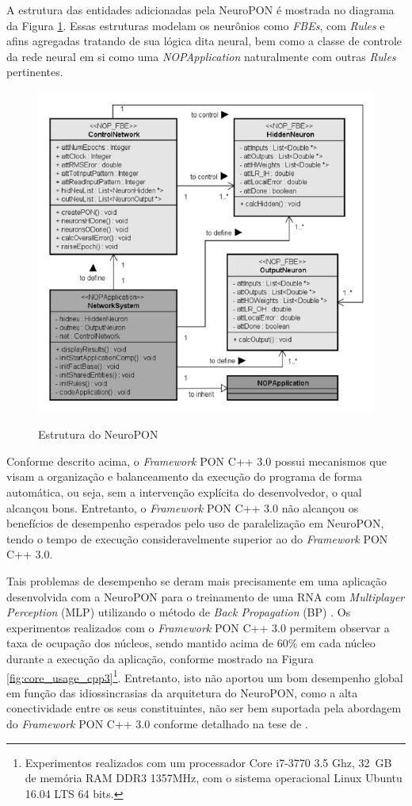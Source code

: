 A estrutura das entidades adicionadas pela NeuroPON é mostrada no diagrama da
Figura \ref{fig:neuro_struct}. Essas estruturas modelam os neurônios como
\textit{FBEs}, com \textit{Rules} e afins agregadas tratando de sua lógica dita
neural, bem como a classe de controle da rede neural em si como uma
\textit{NOPApplication} naturalmente com outras \textit{Rules} pertinentes.

\begin{figure}[!htb]
  \centering
  \caption{Estrutura do NeuroPON}
  \includegraphics[width=.6\textwidth]{../figures/neuropon_struct.png}
  \label{fig:neuro_struct}
\end{figure}

Conforme descrito acima, o \textit{Framework} PON C++ 3.0 possui mecanismos que
visam a organização e balanceamento da execução do programa de forma automática,
ou seja, sem a intervenção explícita do desenvolvedor, o qual alcançou bons.
Entretanto, o \textit{Framework} PON C++ 3.0 não alcançou os benefícios de
desempenho esperados pelo uso de paralelização em NeuroPON, tendo o tempo de
execução consideravelmente superior ao do \textit{Framework} PON C++ 3.0.

Tais problemas de desempenho se deram mais precisamente em uma aplicação
desenvolvida com a NeuroPON para o treinamento de uma RNA com
\textit{Multiplayer Perception} (MLP) utilizando o método de \textit{Back
Propagation} (BP) \cite{schutz_2018}. Os experimentos realizados com o
\textit{Framework} PON C++ 3.0 permitem observar a taxa de ocupação dos núcleos,
sendo mantido acima de 60\% em cada núcleo durante a execução da aplicação,
conforme mostrado na Figura \ref{fig:core_usage_cpp3}\footnote{Experimentos
realizados com um processador Core i7-3770 3.5 Ghz, 32 GB de memória RAM DDR3
1357MHz, com o sistema operacional Linux Ubuntu 16.04 LTS 64 bits.}. Entretanto,
isto não aportou um bom desempenho global em função das idiossincrasias da
arquitetura do NeuroPON, como a alta conectividade entre os seus constituintes,
não ser bem suportada pela abordagem do \textit{Framework} PON C++ 3.0 conforme
detalhado na tese de .

